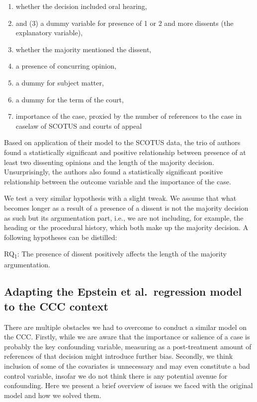 \documentclass[
  11pt,
]{article}
\providecommand{\tightlist}{%
  \setlength{\itemsep}{0pt}\setlength{\parskip}{0pt}}
\begin{document}
\begin{enumerate}
\def\labelenumi{(\arabic{enumi})}
\tightlist
\item
  whether the decision included oral hearing,
\item
  and (3) a dummy variable for presence of 1 or 2 and more dissents (the
  explanatory variable),
\item
  whether the majority mentioned the dissent,
\item
  a presence of concurring opinion,
\item
  a dummy for subject matter,
\item
  a dummy for the term of the court,
\item
  importance of the case, proxied by the number of references to the
  case in caselaw of SCOTUS and courts of appeal
\end{enumerate}

Based on application of their model to the SCOTUS data, the trio of
authors found a statistically significant and positive relationship
between presence of at least two dissenting opinions and the length of
the majority decision. Unsurprisingly, the authors also found a
statistically significant positive relationship between the outcome
variable and the importance of the case.

We test a very similar hypothesis with a slight tweak. We assume that
what becomes longer as a result of a presence of a dissent is not the
majority decision as such but its argumentation part, i.e., we are not
including, for example, the heading or the procedural history, which
both make up the majority decision. A following hypotheses can be
distilled:

RQ\textsubscript{1}: The presence of dissent positively affects the
length of the majority argumentation.

\hypertarget{adapting-the-epstein-et-al.-regression-model-to-the-ccc-context}{%
\subsection{Adapting the Epstein et al.~regression model to the CCC
context}\label{adapting-the-epstein-et-al.-regression-model-to-the-ccc-context}}

There are multiple obstacles we had to overcome to conduct a similar
model on the CCC. Firstly, while we are aware that the importance or
salience of a case is probably the key confounding variable, measuring
as a post-treatment amount of references of that decision might
introduce further bias. Secondly, we think inclusion of some of the
covariates is unnecessary and may even constitute a bad control
variable, insofar we do not think there is any potential avenue for
confounding. Here we present a brief overview of issues we faced with
the original model and how we solved them.
\end{document}
